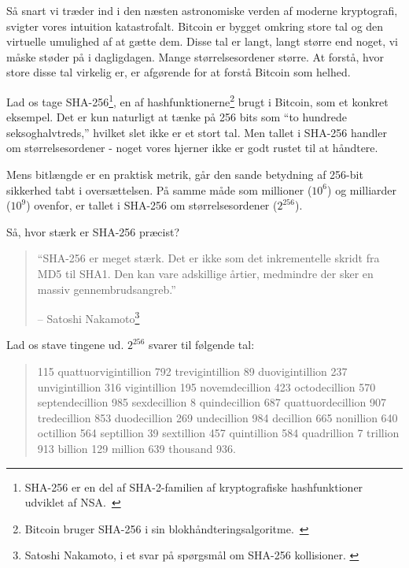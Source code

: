 Så snart vi træder ind i den næsten astronomiske verden af moderne kryptografi, 
svigter vores intuition katastrofalt. Bitcoin er bygget omkring store tal og 
den virtuelle umulighed af at gætte dem. Disse tal er langt, langt større 
end noget, vi måske støder på i dagligdagen. Mange størrelsesordener større. 
At forstå, hvor store disse tal virkelig er, er afgørende for at forstå 
Bitcoin som helhed.

Lad os tage SHA-256\footnote{SHA-256 er en del af SHA-2-familien af 
kryptografiske hashfunktioner udviklet af NSA.~\cite{wiki:sha2}}, en af 
hashfunktionerne\footnote{Bitcoin bruger SHA-256 i sin 
blokhåndteringsalgoritme.~\cite{btcwiki:block-hashing}} brugt i Bitcoin, 
som et konkret eksempel. Det er kun naturligt at tænke på 256 bits som 
\enquote{to hundrede seksoghalvtreds,} hvilket slet ikke er et stort tal. 
Men tallet i SHA-256 handler om størrelsesordener - noget vores hjerner ikke 
er godt rustet til at håndtere.

Mens bitlængde er en praktisk metrik, går den sande betydning af 256-bit 
sikkerhed tabt i oversættelsen. På samme måde som millioner ($10^6$) og 
milliarder ($10^9$) ovenfor, er tallet i SHA-256 om 
størrelsesordener ($2^{256}$).

Så, hvor stærk er SHA-256 præcist?

\begin{quotation}\begin{samepage}
\enquote{SHA-256 er meget stærk. Det er ikke som det inkrementelle skridt 
fra MD5 til SHA1. Den kan vare adskillige årtier, medmindre der sker en massiv
gennembrudsangreb.}
\begin{flushright} -- Satoshi Nakamoto\footnote{Satoshi Nakamoto, i et svar 
  på spørgsmål om SHA-256 kollisioner. \cite{satoshi-sha256}}
\end{flushright}\end{samepage}\end{quotation}

Lad os stave tingene ud. $2^{256}$ svarer til følgende tal:

\begin{quotation}\begin{samepage}
    115 quattuorvigintillion 792 trevigintillion 89 duovigintillion 237
    unvigintillion 316 vigintillion 195 novemdecillion 423 octodecillion 570
    septendecillion 985 sexdecillion 8 quindecillion 687 quattuordecillion 907
    tredecillion 853 duodecillion 269 undecillion 984 decillion 665 nonillion
    640 octillion 564 septillion 39 sextillion 457 quintillion 584 quadrillion 7
    trillion 913 billion 129 million 639 thousand 936.
\end{samepage}\end{quotation}

